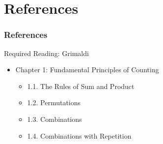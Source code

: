\documentclass[dvipsnames]{beamer}
\begin{document}
\section*{References}

\begin{frame}
  \frametitle{References}
  \begin{block}{Required Reading: Grimaldi}
    \begin{itemize}
      \item Chapter 1: Fundamental Principles of Counting
      \begin{itemize}
        \item 1.1. \alert{The Rules of Sum and Product}
        \item 1.2. \alert{Permutations}
        \item 1.3. \alert{Combinations}
        \item 1.4. \alert{Combinations with Repetition}
      \end{itemize}
    \end{itemize}
  \end{block}
\end{frame}
\end{document}
